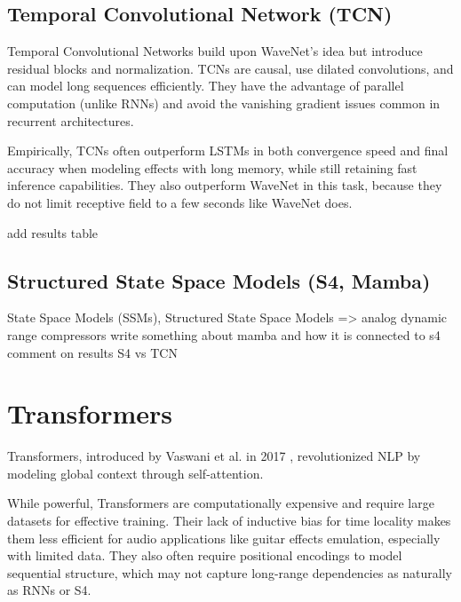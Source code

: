 \documentclass[masterthesis]{fer}
\begin{document}
\subsection{Temporal Convolutional Network (TCN)}


Temporal Convolutional Networks \cite{lea2016temporalconvolutionalnetworksaction} build upon WaveNet’s idea but introduce residual blocks and normalization. TCNs are causal, use dilated convolutions, and can model long sequences efficiently. They have the advantage of parallel computation (unlike RNNs) and avoid the vanishing gradient issues common in recurrent architectures.

Empirically, TCNs often outperform LSTMs in both convergence speed and final accuracy when modeling effects with long memory, while still retaining fast inference capabilities. They also outperform WaveNet in this task, because they do not limit receptive field to a few seconds like WaveNet does. 

 add results table


\subsection{Structured State Space Models (S4, Mamba)}

State Space Models (SSMs), Structured State Space Models 
=>  analog dynamic range compressors
write something about mamba and how it is connected to s4
comment on results S4 vs TCN

\cite{simionato2024comparativestudystatebasedneural}



\section{Transformers}


Transformers, introduced by Vaswani et al. in 2017 \cite{vaswani2023attentionneed}, revolutionized NLP by modeling global context through self-attention.


While powerful, Transformers are computationally expensive and require large datasets for effective training. Their lack of inductive bias for time locality makes them less efficient for audio applications like guitar effects emulation, especially with limited data. They also often require positional encodings to model sequential structure, which may not capture long-range dependencies as naturally as RNNs or S4.
\end{document}
